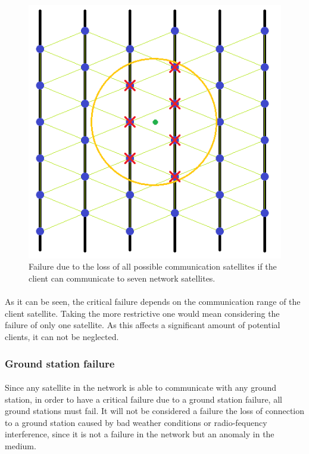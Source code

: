 \begin{figure}[H]
\begin{center}
\includegraphics[scale=0.5]{./sections/Constellation_Deployment/S5-Spare_Strategy/critical3.png}
\caption[7 communication range failure]{Failure due to the loss of all possible communication satellites if the client can communicate to seven network satellites.}
\label{fig:critical3}
\end{center}
\end{figure}

\paragraph{}As it can be seen, the critical failure depends on the communication range of the client satellite. Taking the more restrictive one would mean considering the failure of only one satellite. As this affects a significant amount of potential clients, it can not be neglected.

\subsubsection{Ground station failure}

\paragraph{}Since any satellite in the network is able to communicate with any ground station, in order to have a critical failure due to a ground station failure, all ground stations must fail. It will not be considered a failure the loss of connection to a ground station caused by bad weather conditions or radio-fequency interference, since it is not a failure in the network but an anomaly in the medium.

